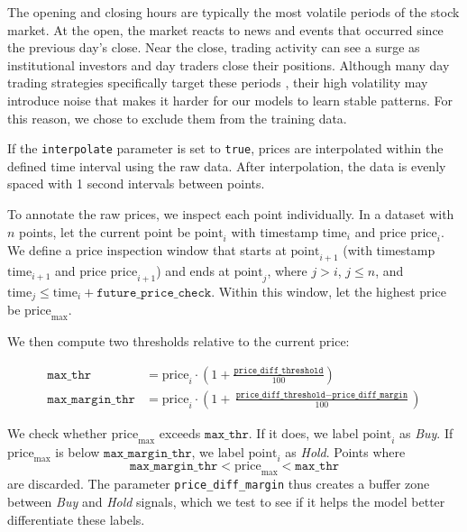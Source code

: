 \documentclass[a4paper,oneside,onecolumn,12pt]{book}
\begin{document}
		The opening and closing hours are typically the most volatile periods of the stock market. At the open, the market reacts to news and events that occurred since the previous day's close. Near the close, trading activity can see a surge as institutional investors and day traders close their positions. Although many day trading strategies specifically target these periods \cite{BTDWMTS}, their high volatility may introduce noise that makes it harder for our models to learn stable patterns. For this reason, we chose to exclude them from the training data.

		If the \texttt{interpolate} parameter is set to \texttt{true}, prices are interpolated within the defined time interval using the raw data. After interpolation, the data is evenly spaced with 1 second intervals between points.

		To annotate the raw prices, we inspect each point individually. In a dataset with $n$ points, let the current point be $\text{point}_i$ with timestamp $\text{time}_i$ and price $\text{price}_i$. We define a price inspection window that starts at $\text{point}_{i+1}$ (with timestamp $\text{time}_{i+1}$ and price $\text{price}_{i+1}$) and ends at $\text{point}_j$, where $j > i$, $j \leq n$, and $\text{time}_j \leq \text{time}_i + \texttt{future\_price\_check}$. Within this window, let the highest price be $\text{price}_{\text{max}}$.

		We then compute two thresholds relative to the current price:

		\begin{align*}
		\texttt{max\_thr} &= \text{price}_i \cdot \left(1 + \frac{\texttt{price\_diff\_threshold}}{100}\right) \\
		\texttt{max\_margin\_thr} &= \text{price}_i \cdot \left(1 + \frac{\texttt{price\_diff\_threshold} - \texttt{price\_diff\_margin}}{100}\right)
		\end{align*}

		We check whether $\text{price}_{\text{max}}$ exceeds $\texttt{max\_thr}$. If it does, we label $\text{point}_i$ as \textit{Buy}. If $\text{price}_{\text{max}}$ is below $\texttt{max\_margin\_thr}$, we label $\text{point}_i$ as \textit{Hold}. Points where
		\[
		\texttt{max\_margin\_thr} < \text{price}_{\text{max}} < \texttt{max\_thr}
		\]
		are discarded. The parameter \texttt{price\_diff\_margin} thus creates a buffer zone between \textit{Buy} and \textit{Hold} signals, which we test to see if it helps the model better differentiate these labels.
		
\end{document}
